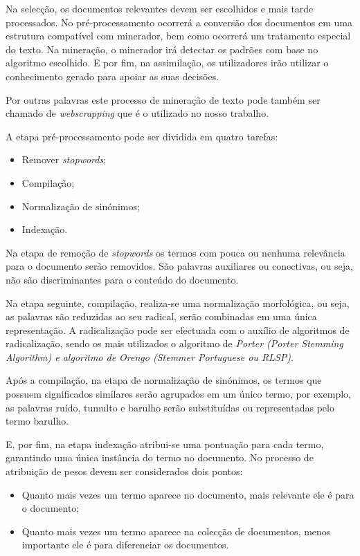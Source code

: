 Na selecção, os documentos relevantes devem ser escolhidos e mais tarde processados.
No pré-processamento ocorrerá a conversão dos documentos em uma estrutura compatível com minerador, bem como ocorrerá um tratamento especial do texto.
Na mineração, o minerador irá detectar os padrões com base no algoritmo escolhido.
E por fim, na assimilação, os utilizadores irão utilizar o conhecimento gerado para apoiar as suas decisões. 

Por outras palavras este processo de mineração de texto pode também ser chamado de \textit{webscrapping} que é o utilizado no nosso trabalho.

A etapa pré-processamento pode ser dividida em quatro tarefas:
\begin{itemize}
  \setlength\itemsep{0.05em}
  \item Remover \textit{stopwords};
  \item Compilação;
  \item Normalização de sinónimos;
  \item Indexação.
\end{itemize}

Na etapa de remoção de \textit{stopwords} os termos com pouca ou nenhuma relevância para o documento serão removidos.
São palavras auxiliares ou conectivas, ou seja, não são discriminantes para o conteúdo do documento.

Na etapa seguinte, compilação, realiza-se uma normalização morfológica, ou seja, as palavras são reduzidas ao seu radical, serão combinadas em uma única representação. A radicalização pode ser efectuada com o auxílio de algoritmos de radicalização, sendo os mais utilizados o algoritmo de \textit{Porter (Porter Stemming Algorithm) e algoritmo de Orengo (Stemmer Portuguese ou RLSP)}.

Após a compilação, na etapa de normalização de sinónimos, os termos que possuem significados similares serão agrupados em um único termo, por exemplo, as palavras ruído, tumulto e barulho serão substituídas ou representadas pelo termo barulho.

E, por fim, na etapa indexação atribui-se uma pontuação para cada termo, garantindo uma única instância do termo no documento.
No processo de atribuição de pesos devem ser considerados dois pontos:
\begin{itemize}
  \setlength\itemsep{0.05em}
  \item Quanto mais vezes um termo aparece no documento, mais relevante ele é para o documento;
  \item Quanto mais vezes um termo aparece na colecção de documentos, menos importante ele é para diferenciar os documentos.
\end{itemize}


